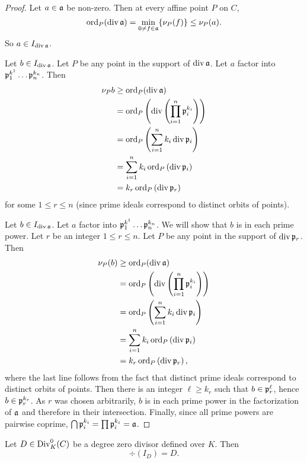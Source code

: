 \begin{proof}
  Let $a \in \frak a$ be non-zero. Then at every affine point $P$ on $C$,
  \[ \ord_P(\div \frak a) = \min_{0 \neq f \in \frak a}\{ \nu_P(f) \} \leq \nu_P(a). \]
  So $a \in I_{\div \frak a}$.
  
  Let $b \in I_{\div \frak a}$.
  Let $P$ be any point in the support of $\div \frak a$.
  Let $a$ factor into $\frak p_1^{k^1} \dots \frak p_n^{k_n}$. Then
  \begin{align*}
    \nu_P b
      &\geq \ord_P(\div \frak a) \\
      &= \ord_P \left( \div \left( \prod_{i=1}^n \frak p_i^{k_i} \right) \right) \\
      &= \ord_P \left( \sum_{i=1}^n k_i \div \frak p_i \right) \\
      &= \sum_{i=1}^n k_i \ord_P \left( \div \frak p_i \right) \\
      &= k_r \ord_P \left( \div \frak p_r \right)
  \end{align*}
  for some $1 \leq r \leq n$ (since prime ideals correspond to distinct orbits of points).
  
  
  Let $b \in I_{\div \frak a}$.
  Let $a$ factor into $\frak p_1^{k^1} \dots \frak p_n^{k_n}$.
  We will show that $b$ is in each prime power.
  Let $r$ be an integer $1 \leq r \leq n$.
  Let $P$ be any point in the support of $\div \frak p_r$. Then
  \begin{align*}
    \nu_P(b)
      &\geq \ord_P(\div \frak a) \\
      &= \ord_P \left( \div \left( \prod_{i=1}^n \frak p_i^{k_i} \right) \right) \\
      &= \ord_P \left( \sum_{i=1}^n k_i \div \frak p_i \right) \\
      &= \sum_{i=1}^n k_i \ord_P \left( \div \frak p_i \right) \\
      &= k_r \ord_P \left( \div \frak p_r \right),
  \end{align*}
  where the last line follows from the fact that distinct prime ideals correspond to distinct orbits of points.
  Then there is an integer $\ell \geq k_r$ such that $b \in \frak p_r^\ell$, hence $b \in \frak p_r^{k_r}$.
  As $r$ was chosen arbitrarily, $b$ is in each prime power in the factorization of $\frak a$ and therefore in their intersection.
  Finally, since all prime powers are pairwise coprime, $\bigcap \frak p_i^{k_i} = \prod \frak p_i^{k_i} = \frak a$.
\end{proof}
\begin{lemma}
  Let $D \in \Div_K^0(C)$ be a degree zero divisor defined over $K$. Then
  \[ \div(I_D) = D. \]
\end{lemma}
